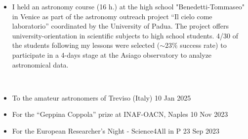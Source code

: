 \begin{experiences}
    {
     \begin{itemize}
         \item I held an astronomy course (16 h.) at the high school "Benedetti-Tommaseo" in Venice as part of the astronomy outreach project ``Il cielo come laboratorio'' coordinated by the University of Padua. The project offers university-orientation in scientific subjects to high school students. 4/30 of the students following my lessons were selected ($\sim 23 \%$ success rate) to participate in a 4-days stage at the Asiago observatory to analyze astronomical data.   %
     \end{itemize}}
     \\
    \emptySeparator

    \newpage
    {
     \begin{itemize}
         \item To the amateur astronomers of Treviso (Italy) \hfill 10 Jan 2025
         \item For the ``Geppina Coppola'' prize at INAF-OACN, Naples  \hfill 10 Nov 2023 %
         \item For the European Researcher's Night - Science4All in P  \hfill 23 Sep 2023
     \end{itemize}}
\end{experiences}